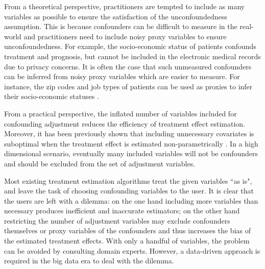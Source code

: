 \documentclass[letterpaper]{article} %
\begin{document}
From a theoretical perspective, practitioners are tempted to include as many variables as possible to ensure the satisfaction of the unconfoundedness assumption.
This is because confounders can be difficult to measure in the real-world and practitioners need to include noisy proxy variables to ensure unconfoundedness.
For example, the socio-economic status of patients confounds treatment and prognosis, but cannot be included in the electronic medical records due to privacy concerns. It is often the case that such unmeasured confounders can be inferred from noisy proxy variables which are easier to measure. For instance, the zip codes and job types of patients can be used as proxies to infer their socio-economic statuses \cite{Sauer2013}.

From a practical perspective, the inflated number of variables included for confounding adjustment reduces the efficiency of treatment effect estimation.
Moreover, it has been previously shown that including unnecessary covariates is suboptimal when the treatment effect is estimated non-parametrically \cite{Hahn1998,Abadie2006,Haeggstroem2017}. In a high dimensional scenario, eventually many included variables will not be confounders and should be excluded from the set of adjustment variables.


Most existing treatment estimation algorithms treat the given variables ``as is", and leave the task of choosing confounding variables to the user.
It is clear that the users are left with a dilemma: on the one hand including more variables than necessary produces inefficient and inaccurate estimators; on the other hand restricting the number of adjustment variables may exclude confounders themselves or proxy variables of the confounders and thus increases the bias of the estimated treatment effects.
With only a handful of variables, the problem can be avoided by consulting domain experts.
However, a data-driven approach is required in the big data era to deal with the dilemma.
\end{document}
